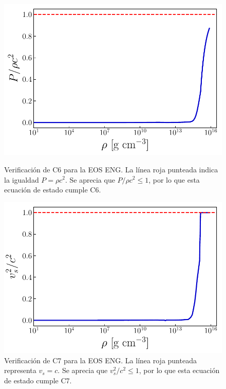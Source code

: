 \begin{figure}[H]
   \begin{minipage}[b]{.48\textwidth}
        \centering
        \includegraphics[width=1\textwidth]{figures/ECeng.pdf}
        \caption{Verificación de C6 para la EOS ENG. La línea roja punteada indica la igualdad $P=\rho c^2$. Se aprecia que $P/\rho c^2 \leq 1$, por lo que esta ecuación de estado cumple C6.}
        \label{DECeng}
    \end{minipage}
    \quad
    \begin{minipage}[b]{.48\textwidth}
        \centering
        \includegraphics[width=1\textwidth]{figures/SSeng.pdf}
        \caption{Verificación de C7 para la EOS ENG. La línea roja punteada representa $v_s=c$. Se aprecia que $v_s^2/c^2 \leq 1$, por lo que esta ecuación de estado cumple C7.}
        \label{SSCeng}
    \end{minipage}
\end{figure}



